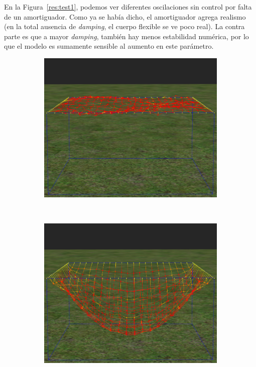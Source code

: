En la Figura~\ref{res:test1}, podemos ver diferentes oscilaciones sin control por falta de un amortiguador.
Como ya se había dicho, el amortiguador agrega realismo (en la total ausencia de \emph{\textenglish{damping}}, el cuerpo flexible se ve poco real). La contra parte es que a mayor \emph{\textenglish{damping}}, también hay menos estabilidad numérica, por lo que el modelo es sumamente sensible al aumento en este parámetro.

\begin{figure}
 \centering
  \begin{subfigure}[b]{0.30\textwidth}
    \includegraphics[width=\textwidth]{img/04/noDamp1}
  \end{subfigure}
~
  \begin{subfigure}[b]{0.30\textwidth}
    \includegraphics[width=\textwidth]{img/04/noDamp2}

\end{subfigure}
\end{figure}
